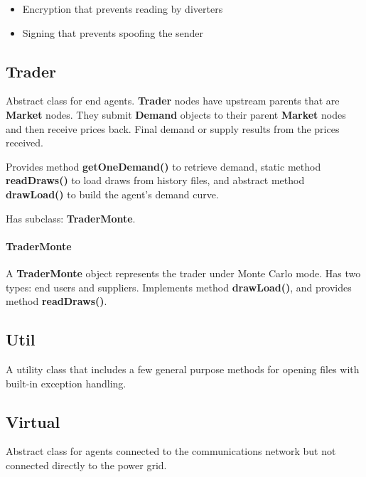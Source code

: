 \documentclass[12pt]{article}
\begin{document}
\begin{itemize}
  \item{Encryption that prevents reading by diverters}
  \item{Signing that prevents spoofing the sender}
\end{itemize}

\subsection{Trader} \mbox{}

Abstract class for end agents. \textbf{Trader} nodes have upstream parents
that are \textbf{Market} nodes.  They submit \textbf{Demand} objects 
to their parent \textbf{Market} nodes and then receive prices back. 
Final demand or supply results from the prices received. 

Provides method \textbf{getOneDemand()} to retrieve demand, static method 
\textbf{readDraws()} to load draws from history files, and abstract method 
\textbf{drawLoad()} to build the agent's demand curve.

Has subclass: \textbf{TraderMonte}.

\paragraph{TraderMonte} \mbox{}

A \textbf{TraderMonte} object represents the trader under Monte Carlo mode. 
Has two types: end users and suppliers. Implements method \textbf{drawLoad()}, 
and provides method \textbf{readDraws()}.

\subsection{Util} \mbox{}

A utility class that includes a few general purpose methods for opening
files with built-in exception handling.

\subsection{Virtual} \mbox{}

Abstract class for agents connected to the communications network but not
connected directly to the power grid.  
\end{document}

